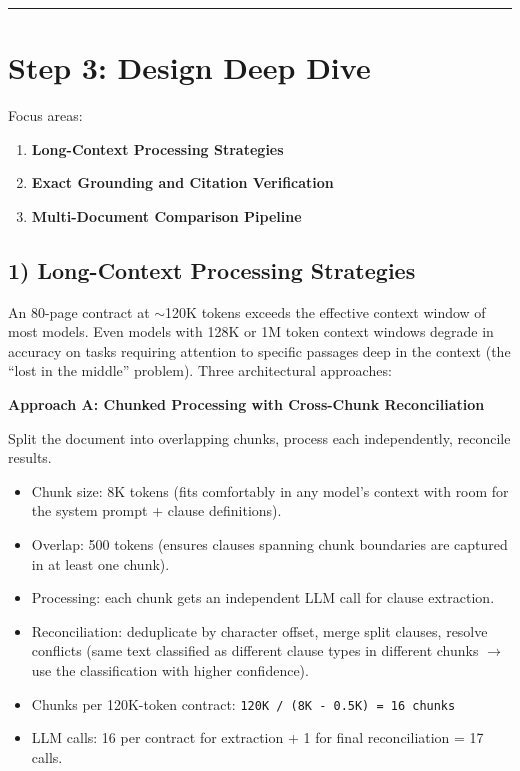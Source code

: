 \bigskip\hrule\bigskip

\section*{Step 3: Design Deep Dive}

Focus areas:

\begin{enumerate}
  \item \textbf{Long-Context Processing Strategies}
  \item \textbf{Exact Grounding and Citation Verification}
  \item \textbf{Multi-Document Comparison Pipeline}
\end{enumerate}

\subsection*{1) Long-Context Processing Strategies}

An 80-page contract at $\sim$120K tokens exceeds the effective context window of most models. Even models with 128K or 1M token context windows degrade in accuracy on tasks requiring attention to specific passages deep in the context (the ``lost in the middle'' problem). Three architectural approaches:

\textbf{Approach A: Chunked Processing with Cross-Chunk Reconciliation}

Split the document into overlapping chunks, process each independently, reconcile results.

\begin{itemize}
  \item Chunk size: 8K tokens (fits comfortably in any model's context with room for the system prompt + clause definitions).
  \item Overlap: 500 tokens (ensures clauses spanning chunk boundaries are captured in at least one chunk).
  \item Processing: each chunk gets an independent LLM call for clause extraction.
  \item Reconciliation: deduplicate by character offset, merge split clauses, resolve conflicts (same text classified as different clause types in different chunks $\rightarrow$ use the classification with higher confidence).
  \item Chunks per 120K-token contract: \texttt{120K / (8K - 0.5K) = 16 chunks}
  \item LLM calls: 16 per contract for extraction + 1 for final reconciliation = 17 calls.
\end{itemize}

